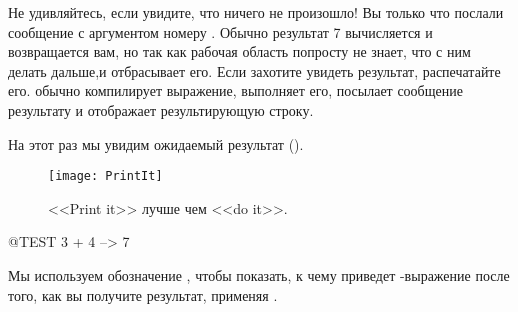 \documentclass[a4paper,10pt,twoside]{book}
\begin{document}

Не удивляйтесь, если увидите, что ничего не произошло!
Вы только что послали сообщение \ct{+} с аргументом  номеру
. Обычно результат 7 вычисляется и возвращается вам,
но так как рабочая область попросту не знает, что с ним делать
дальше,и отбрасывает его. Если захотите увидеть результат,
распечатайте его. 
обычно компилирует выражение, выполняет его, посылает
сообщение  результату и отображает
результирующую строку.


На этот раз мы увидим ожидаемый результат ().

\begin{figure}[htb]
\centerline {\texttt{[image: PrintIt]}}
\caption{<<Print it>> лучше чем <<do it>>.}
\end{figure}

\begin{code}{@TEST}
3 + 4 --> 7
\end{code}


\noindent
Мы используем обозначение \ct{-->},
чтобы показать, к чему приведет \pharo-выражение после того,
как вы получите результат, применяя . 

\end{document}
